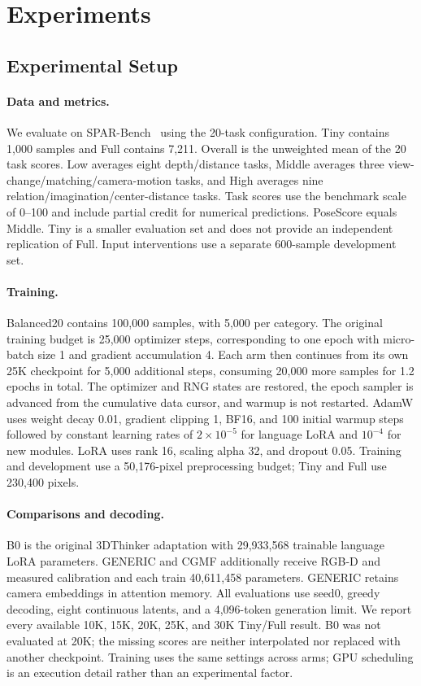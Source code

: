 \section{Experiments}
\label{sec:experiments}
\subsection{Experimental Setup}
\paragraph{Data and metrics.}
We evaluate on SPAR-Bench~\cite{spar} using the 20-task configuration. Tiny contains 1,000 samples and Full contains 7,211. Overall is the unweighted mean of the 20 task scores. Low averages eight depth/distance tasks, Middle averages three view-change/matching/camera-motion tasks, and High averages nine relation/imagination/center-distance tasks. Task scores use the benchmark scale of 0--100 and include partial credit for numerical predictions. PoseScore equals Middle. Tiny is a smaller evaluation set and does not provide an independent replication of Full. Input interventions use a separate 600-sample development set.

\paragraph{Training.}
Balanced20 contains 100,000 samples, with 5,000 per category. The original training budget is 25,000 optimizer steps, corresponding to one epoch with micro-batch size 1 and gradient accumulation 4. Each arm then continues from its own 25K checkpoint for 5,000 additional steps, consuming 20,000 more samples for 1.2 epochs in total. The optimizer and RNG states are restored, the epoch sampler is advanced from the cumulative data cursor, and warmup is not restarted. AdamW uses weight decay 0.01, gradient clipping 1, BF16, and 100 initial warmup steps followed by constant learning rates of $2\times10^{-5}$ for language LoRA and $10^{-4}$ for new modules. LoRA uses rank 16, scaling alpha 32, and dropout 0.05. Training and development use a 50,176-pixel preprocessing budget; Tiny and Full use 230,400 pixels.

\paragraph{Comparisons and decoding.}
B0 is the original 3DThinker adaptation with 29,933,568 trainable language LoRA parameters. GENERIC and CGMF additionally receive RGB-D and measured calibration and each train 40,611,458 parameters. GENERIC retains camera embeddings in attention memory. All evaluations use seed0, greedy decoding, eight continuous latents, and a 4,096-token generation limit. We report every available 10K, 15K, 20K, 25K, and 30K Tiny/Full result. B0 was not evaluated at 20K; the missing scores are neither interpolated nor replaced with another checkpoint. Training uses the same settings across arms; GPU scheduling is an execution detail rather than an experimental factor.

